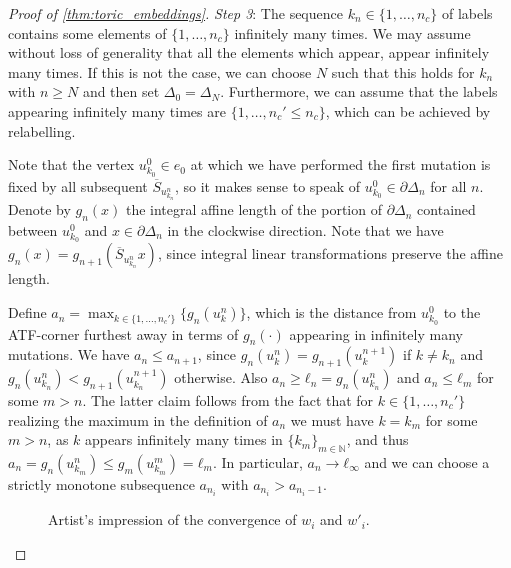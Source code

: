 \documentclass[12pt,a4paper,abstract=true,draft]{scrartcl}
\begin{document}
\begin{proof}[Proof of \cref{thm:toric_embeddings}]
  \emph{Step 3}: The sequence $k_n ∈ \{1,…,n_c\}$ of labels contains some elements of $\{1,…,n_c\}$ infinitely many times.
  We may assume without loss of generality that all the elements which appear, appear infinitely many times. If this is not the case, we can choose $N$ such that this holds for $k_n$ with $n≥N$ and then set $Δ_0=Δ_N$. Furthermore, we can assume that the labels appearing infinitely many times are $\{1,…,n_c'≤n_c\}$, which can be achieved by relabelling.

  Note that the vertex $u_{k_0}^0 ∈ e_0$ at which we have performed the first mutation is fixed by all subsequent $\overline{S}_{u_{k_n}^n}$, so it makes sense to speak of $u_{k_0}^0 ∈ ∂Δ_n$ for all $n$.
  Denote by $g_n(x)$ the integral affine length of the portion of $\partial \Delta_n$ contained between $u_{k_0}^0$ and $x ∈ ∂Δ_n$ in the clockwise direction.
Note that we have $g_n(x) = g_{n+1}(\overline{S}_{u_{k_n}^n}x)$, since integral linear transformations preserve the affine length.

  Define $a_n = \max_{k ∈\{1,…,n_c'\}} \{g_n(u_k^n)\}$, which is the distance from $u_{k_0}^0$ to the  ATF-corner furthest away in terms of $g_n(\cdot)$ appearing in infinitely many mutations.
We have $a_n ≤ a_{n+1}$, since $g_n(u_k^n) = g_{n+1}(u_k^{n+1})$ if $k ≠ k_n$ and $g_n(u_{k_n}^n) < g_{n+1}(u_{k_n}^{n+1})$ otherwise.
Also $a_n ≥ ℓ_n = g_n(u_{k_n}^n)$ and $a_n ≤ ℓ_m$ for some $m>n$.
The latter claim follows from the fact that for $k ∈ \{1, …, n_c'\}$ realizing the maximum in the definition of $a_n$ we must have $k = k_m$ for some $m>n$, as $k$ appears infinitely many times in $\{k_m\}_{m ∈ ℕ}$, and thus $a_n = g_n(u^n_{k_m}) ≤ g_m(u^m_{k_m}) = ℓ_m$.
In particular, $a_n → ℓ_∞$ and we can choose a strictly monotone subsequence $a_{n_i}$ with $a_{n_i} > a_{n_i-1}$.

  \begin{figure}
    \centering
    \caption{Artist's impression of the convergence of $w_i$ and $w'_i$.}
    \label{fig:stretch_wi}
  \end{figure}


\end{proof}
\end{document}

